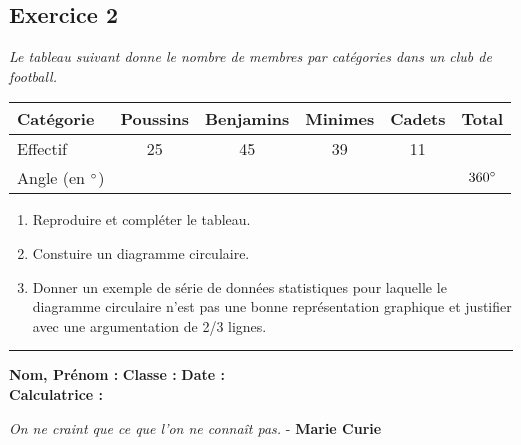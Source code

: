 \documentclass[12pt]{article}
\newcommand{\horrule}[1]{\rule{\linewidth}{#1}} %
\begin{document}
\subsection*{Exercice 2} 

\textit{Le tableau suivant donne le nombre de membres par catégories dans un club de football.}

\begin{center}
  \begin{tabular}{| l || c | c | c | c | c | }
    \hline
    Catégorie            & Poussins & Benjamins & Minimes & Cadets & Total         \\
    \hline
    Effectif             &       25 &        45 &      39 &    11  &               \\
    \hline
    Angle (en $\degree$) &          &           &         &        & $360 \degree$ \\
    \hline
  \end{tabular}
\end{center}

\begin{enumerate}
\item Reproduire et compléter le tableau.
\item Constuire un diagramme circulaire.
\item Donner un exemple de série de données statistiques pour laquelle le diagramme circulaire n'est pas une bonne représentation graphique et justifier avec une argumentation de 2/3 lignes.
\end{enumerate}

\vspace{0.2cm}
\horrule{1px}
\vspace{0.2cm}

\textbf{Nom, Prénom :} \hspace{8cm} \textbf{Classe :} \hspace{3cm} \textbf{Date :}\\
\textbf{Calculatrice :}

\begin{center}
  \textit{On ne craint que ce que l'on ne connaît pas.}  - \textbf{Marie Curie}
\end{center}


\setlength{\columnseprule}{1pt}
\end{document}
